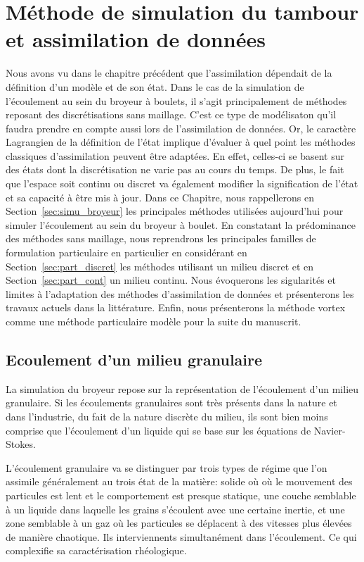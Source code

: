 
\chapter{Méthode de simulation du tambour et assimilation de données}

Nous avons vu dans le chapitre précédent que l'assimilation dépendait de la définition d'un modèle et de son état. Dans le cas de la simulation de l'écoulement au sein du broyeur à boulets, il s'agit principalement de méthodes reposant des discrétisations sans maillage. C'est ce type de modélisaton qu'il faudra prendre en compte aussi lors de l'assimilation de données. Or, le caractère Lagrangien de la définition de l'état implique d'évaluer à quel point les méthodes classiques d'assimilation peuvent être adaptées. En effet, celles-ci se basent sur des états dont la discrétisation ne varie pas au cours du temps. De plus, le fait que l'espace soit continu ou discret va également modifier la signification de l'état et sa capacité à être mis à jour.
Dans ce Chapitre, nous rappellerons en Section~\ref{sec:simu_broyeur} les principales méthodes utilisées aujourd'hui pour simuler l'écoulement au sein du broyeur à boulet. En constatant la prédominance des méthodes sans maillage, nous reprendrons les principales familles de formulation particulaire en particulier en considérant en Section~\ref{sec:part_discret} les méthodes utilisant un milieu discret et en Section~\ref{sec:part_cont} un milieu continu. Nous évoquerons les sigularités et limites à l'adaptation des méthodes d'assimilation de données et présenterons les travaux actuels dans la littérature. Enfin, nous présenterons la méthode vortex comme une méthode particulaire modèle pour la suite du manuscrit.

\section{Ecoulement d'un milieu granulaire} %

La simulation du broyeur repose sur la représentation de l'écoulement d'un milieu granulaire. Si les écoulements granulaires sont très présents dans la nature et dans l'industrie, du fait de la nature discrète du milieu, ils sont bien moins comprise que l'écoulement d'un liquide qui se base sur les équations de Navier-Stokes.

L'écoulement granulaire va se distinguer par trois types de régime que l'on assimile généralement au trois état de la matière: solide où où le mouvement des particules est lent et le comportement est presque statique, une couche semblable à un liquide dans laquelle les grains s'écoulent avec une certaine inertie, et une zone semblable à un gaz où les particules se déplacent à des vitesses plus élevées de manière chaotique. Ils interviennents simultanément dans l'écoulement. Ce qui complexifie sa caractérisation rhéologique.

